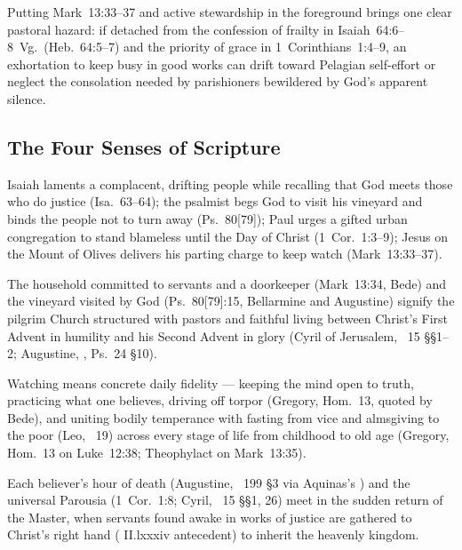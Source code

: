 Putting Mark~13:33--37 and active stewardship in the foreground brings one clear pastoral hazard: if detached from the confession of frailty in Isaiah~64:6--8~Vg.\ (Heb.~64:5--7) and the priority of grace in 1~Corinthians~1:4--9, an exhortation to keep busy in good works can drift toward Pelagian self-effort or neglect the consolation needed by parishioners bewildered by God's apparent silence.

\subsection{The Four Senses of Scripture}

\begin{fourSenses}
\item[Literal.] Isaiah laments a complacent, drifting people while recalling that God meets those who do justice (Isa.~63--64); the psalmist begs God to visit his vineyard and binds the people not to turn away (Ps.~80[79]); Paul urges a gifted urban congregation to stand blameless until the Day of Christ (1~Cor.~1:3--9); Jesus on the Mount of Olives delivers his parting charge to keep watch (Mark~13:33--37).
\item[Allegorical.] The household committed to servants and a doorkeeper (Mark~13:34, Bede) and the vineyard visited by God (Ps.~80[79]:15, Bellarmine and Augustine) signify the pilgrim Church structured with pastors and faithful living between Christ's First Advent in humility and his Second Advent in glory (Cyril of Jerusalem, ~15 §§1--2; Augustine, , Ps.~24 §10).
\item[Moral.] Watching means concrete daily fidelity --- keeping the mind open to truth, practicing what one believes, driving off torpor (Gregory, Hom.~13, quoted by Bede), and uniting bodily temperance with fasting from vice and almsgiving to the poor (Leo, ~19) across every stage of life from childhood to old age (Gregory, Hom.~13 on Luke~12:38; Theophylact on Mark~13:35).
\item[Anagogical.] Each believer's hour of death (Augustine, ~199 §3 via Aquinas's ) and the universal Parousia (1~Cor.~1:8; Cyril, ~15 §§1, 26) meet in the sudden return of the Master, when servants found awake in works of justice are gathered to Christ's right hand ( II.lxxxiv antecedent) to inherit the heavenly kingdom.
\end{fourSenses}
